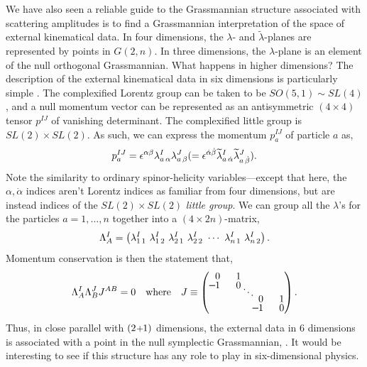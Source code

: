 \documentclass[12pt,hyperref,compress]{JHEP3}
\newcommand{\eq}[1]{\begin{equation}#1\end{equation}}
\newcommand{\mi}{{\rm\rule[2.4pt]{6pt}{0.65pt}}}
\newcommand{\pl}{\hspace{0.5pt}\text{{\small+}}\hspace{-0.5pt}}
\begin{document}
We have also seen a reliable guide to the Grassmannian structure associated with scattering amplitudes is to find a Grassmannian interpretation of the space of external kinematical data. In four dimensions, the $\lambda$- and $\widetilde \lambda$-planes are represented by points in $G(2,n)$. In three dimensions, the $\lambda$-plane is an element of the null orthogonal Grassmannian. What happens in higher dimensions? The description of the external kinematical data in six dimensions is particularly simple \cite{Cheung:2009dc}. The complexified Lorentz group can be taken to be $SO(5,1)\!\sim\!SL(4)$, and a null momentum vector can be represented as an antisymmetric $(4\!\times\!4)$ tensor $p^{IJ}$ of vanishing determinant. The complexified little group is $SL(2)\!\times\!SL(2)$.
As such, we can express the momentum $p_a^{IJ}$ of particle $a$ as,
\vspace{-.2cm}\eq{p_a^{IJ} = \epsilon^{\alpha \beta} \lambda^I_{a\,\alpha} \lambda^J_{a\,\beta} (= \epsilon^{\dot{\alpha} \dot{\beta}} \widetilde \lambda^I_{a\,\dot{\alpha}} \widetilde \lambda^J_{a\,\dot{\beta}}).\vspace{-.2cm}}
Note the similarity to ordinary spinor-helicity variables---except that here, the $\alpha, \dot{\alpha}$ indices aren't Lorentz indices as familiar from four dimensions, but are instead indices of the $SL(2)\times SL(2)$ {\it little group}. We can group all the $\lambda$'s for the particles $a= 1,\ldots,n$ together into a $(4\!\times\!2n)$-matrix,
\vspace{-.2cm}\eq{
\Lambda_A^{I} = \left(\lambda^I_{1\,1} \, \, \lambda^I_{1\,2} \, \, \lambda^I_{2\,1} \, \, \lambda^I_{2\,2} \, \, \cdots\,\, \lambda^I_{n\,1} \, \, \lambda^I_{n\,2} \right).\vspace{-.2cm}}
Momentum conservation is then the statement that,
\vspace{-.2cm}\eq{\Lambda_A^I\Lambda_B^JJ^{AB}=0\quad\mathrm{where}\quad J\equiv\left(\begin{array}{@{}cc@{$\,$}c@{$\!$}cc@{}}0&1&\\[-3pt]\mi1\phantom{\mi}&0&\\[-10pt]&&\ddots\\[-7pt]&&&0&1\\[-3pt]&&&\mi1\phantom{\mi}&0\end{array}\right).\vspace{-.2cm}}
Thus, in close parallel with $(2\pl1)$ dimensions, the external data in $6$ dimensions is associated with a point in the null symplectic Grassmannian, \cite{yinthuang}. It would be interesting to see if this structure has any role to play in six-dimensional physics.
\end{document}
